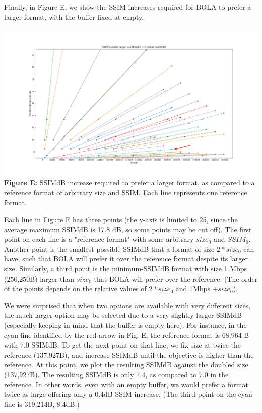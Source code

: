 \documentclass[12pt]{article}
\begin{document}
Finally, in Figure E, we show the SSIM increases required for BOLA to prefer a larger format, with the buffer fixed at empty.\\\\
\hspace*{-3cm}\includegraphics[width=1.3\textwidth]{ssim_to_prefer_sz.png} 
\textbf{Figure E:} SSIMdB increase required to prefer a larger format, as compared to a reference format of arbitrary size and SSIM. Each line represents one reference format. 
 
Each line in Figure E has three points (the y-axis is limited to 25, since the average maximum SSIMdB is 17.8 dB, so some points may be cut off). The first point on each line is a "reference format" with some arbitrary $size_0$ and $SSIM_0$. Another point is the smallest possible SSIMdB that a format of size $2 * size_0$ can have, such that BOLA will prefer it over the reference format despite its larger size. Similarly, a third point is the minimum-SSIMdB format with size 1 Mbps (250,250B) larger than $size_0$ that BOLA will prefer over the reference. (The order of the points depends on the relative values of $2 * size_0$ and 1Mbps $ + size_0$).
 
We were surprised that when two options are available with very different sizes, the much larger option may be selected due to a very slightly larger SSIMdB (especially keeping in mind that the buffer is empty here). For instance, in the cyan line identified by the red arrow in Fig. E, the reference format is 68,964 B with 7.0 SSIMdB. To get the next point on that line, we fix size at twice the reference (137,927B), and increase SSIMdB until the objective is higher than the reference. At this point, we plot the resulting SSIMdB against the doubled size (137,927B). The resulting SSIMdB is only 7.4, as compared to 7.0 in the reference. In other words, even with an empty buffer, we would prefer a format twice as large offering only a 0.4dB SSIM increase. (The third point on the cyan line is 319,214B, 8.4dB.)
\end{document}
